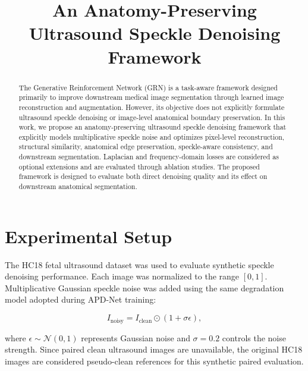 \documentclass[conference]{IEEEtran}
\begin{document}

\title{An Anatomy-Preserving Ultrasound Speckle Denoising Framework}

\author{
\IEEEauthorblockN{}
\IEEEauthorblockA{}
}

\maketitle



\begin{abstract}
The Generative Reinforcement Network (GRN) is a task-aware framework
designed primarily to improve downstream medical image segmentation
through learned image reconstruction and augmentation. However, its
objective does not explicitly formulate ultrasound speckle denoising
or image-level anatomical boundary preservation. In this work, we
propose an anatomy-preserving ultrasound speckle denoising framework
that explicitly models multiplicative speckle noise and optimizes
pixel-level reconstruction, structural similarity, anatomical edge
preservation, speckle-aware consistency, and downstream segmentation.
Laplacian and frequency-domain losses are considered as optional
extensions and are evaluated through ablation studies. The proposed
framework is designed to evaluate both direct denoising quality and
its effect on downstream anatomical segmentation.
\end{abstract}

\section{Experimental Setup}

The HC18 fetal ultrasound dataset was used to evaluate synthetic speckle denoising performance. Each image was normalized to the range $[0,1]$. Multiplicative Gaussian speckle noise was added using the same degradation model adopted during APD-Net training:

\begin{equation}
I_{\mathrm{noisy}} = I_{\mathrm{clean}} \odot (1+\sigma\epsilon),
\end{equation}

where $\epsilon \sim \mathcal{N}(0,1)$ represents Gaussian noise and $\sigma=0.2$ controls the noise strength. Since paired clean ultrasound images are unavailable, the original HC18 images are considered pseudo-clean references for this synthetic paired evaluation.
\end{document}
